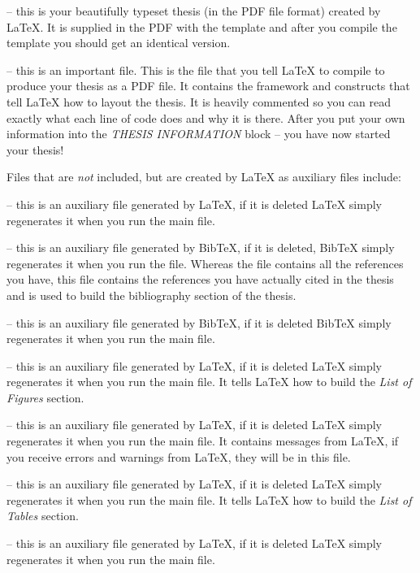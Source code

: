  -- this is your beautifully typeset thesis (in the PDF file 
format) created by \LaTeX{}. It is supplied in the PDF with the template and 
after you compile the template you should get an identical version.

 -- this is an important file. This is the file that you tell 
\LaTeX{} to compile to produce your thesis as a PDF file. It contains the 
framework and constructs that tell \LaTeX{} how to layout the thesis. It is 
heavily commented so you can read exactly what each line of code does and why 
it is there. After you put your own information into the \emph{THESIS INFORMATION} 
block -- you have now started your thesis!

Files that are \emph{not} included, but are created by \LaTeX{} as auxiliary 
files include:

 -- this is an auxiliary file generated by \LaTeX{}, if it is 
deleted \LaTeX{} simply regenerates it when you run the main  file.

 -- this is an auxiliary file generated by BibTeX, if it is 
deleted, BibTeX simply regenerates it when you run the  file. 
Whereas the  file contains all the references you have, this 
 file contains the references you have actually cited in the thesis 
and is used to build the bibliography section of the thesis.

 -- this is an auxiliary file generated by BibTeX, if it is 
deleted BibTeX simply regenerates it when you run the main  file.

 -- this is an auxiliary file generated by \LaTeX{}, if it is 
deleted \LaTeX{} simply regenerates it when you run the main  file. 
It tells \LaTeX{} how to build the \emph{List of Figures} section.

 -- this is an auxiliary file generated by \LaTeX{}, if it is 
deleted \LaTeX{} simply regenerates it when you run the main  file. 
It contains messages from \LaTeX{}, if you receive errors and warnings from 
\LaTeX{}, they will be in this  file.

 -- this is an auxiliary file generated by \LaTeX{}, if it is 
deleted \LaTeX{} simply regenerates it when you run the main  file.
 It tells \LaTeX{} how to build the \emph{List of Tables} section.

 -- this is an auxiliary file generated by \LaTeX{}, if it is 
deleted \LaTeX{} simply regenerates it when you run the main  file.

